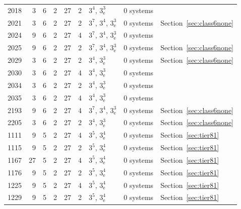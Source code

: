 {\begin{tabular}{rrrrrrlll}
2018 & 3 & 6 & 2 & 27 & 2 & $3^{4}$, $3^{3}_{\mathrm{e}}$ & 0 systems & \\
2021 & 3 & 6 & 2 & 27 & 2 & $3^{7}$, $3^{4}$, $3^{3}_{\mathrm{e}}$ & 0 systems & Section~\ref{sec:class6none}\\
2024 & 9 & 6 & 2 & 27 & 4 & $3^{7}$, $3^{4}$, $3^{3}_{\mathrm{e}}$ & 0 systems & \\
2025 & 9 & 6 & 2 & 27 & 2 & $3^{7}$, $3^{4}$, $3^{3}_{\mathrm{e}}$ & 0 systems & Section~\ref{sec:class6none}\\
2029 & 3 & 6 & 2 & 27 & 2 & $3^{4}$, $3^{3}_{\mathrm{e}}$ & 0 systems & Section~\ref{sec:class6none}\\
2030 & 3 & 6 & 2 & 27 & 4 & $3^{4}$, $3^{3}_{\mathrm{e}}$ & 0 systems & \\
2034 & 3 & 6 & 2 & 27 & 2 & $3^{4}$, $3^{3}_{\mathrm{e}}$ & 0 systems & \\
2035 & 3 & 6 & 2 & 27 & 4 & $3^{4}$, $3^{3}_{\mathrm{e}}$ & 0 systems & \\
2193 & 9 & 6 & 2 & 27 & 4 & $3^{7}$, $3^{4}$, $3^{3}_{\mathrm{e}}$ & 0 systems & Section~\ref{sec:class6none}\\
2205 & 3 & 6 & 2 & 27 & 2 & $3^{4}$, $3^{3}_{\mathrm{e}}$ & 0 systems & Section~\ref{sec:class6none}\\
1111 & 9 & 5 & 2 & 27 & 4 & $3^{5}$, $3^{4}_{\mathrm{e}}$ & 0 systems & Section~\ref{sec:tier81}\\
1115 & 9 & 5 & 2 & 27 & 2 & $3^{5}$, $3^{4}_{\mathrm{e}}$ & 0 systems & Section~\ref{sec:tier81}\\
1167 & 27 & 5 & 2 & 27 & 4 & $3^{5}$, $3^{4}_{\mathrm{e}}$ & 0 systems & Section~\ref{sec:tier81}\\
1176 & 9 & 5 & 2 & 27 & 2 & $3^{5}$, $3^{4}_{\mathrm{e}}$ & 0 systems & Section~\ref{sec:tier81}\\
1225 & 9 & 5 & 2 & 27 & 4 & $3^{5}$, $3^{4}_{\mathrm{e}}$ & 0 systems & Section~\ref{sec:tier81}\\
1229 & 9 & 5 & 2 & 27 & 2 & $3^{5}$, $3^{4}_{\mathrm{e}}$ & 0 systems & Section~\ref{sec:tier81}\\
\bottomrule
\end{tabular}}

